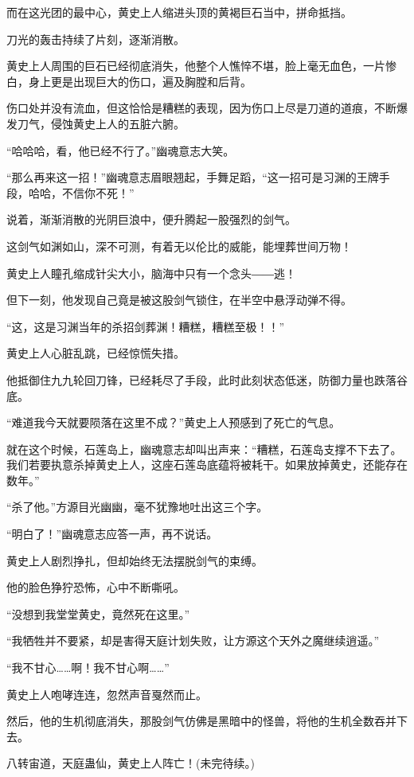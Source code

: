 \begin{this_body}
而在这光团的最中心，黄史上人缩进头顶的黄褐巨石当中，拼命抵挡。

刀光的轰击持续了片刻，逐渐消散。

黄史上人周围的巨石已经彻底消失，他整个人憔悴不堪，脸上毫无血色，一片惨白，身上更是出现巨大的伤口，遍及胸膛和后背。

伤口处并没有流血，但这恰恰是糟糕的表现，因为伤口上尽是刀道的道痕，不断爆发刀气，侵蚀黄史上人的五脏六腑。

“哈哈哈，看，他已经不行了。”幽魂意志大笑。

“那么再来这一招！”幽魂意志眉眼翘起，手舞足蹈，“这一招可是习渊的王牌手段，哈哈，不信你不死！”

说着，渐渐消散的光阴巨浪中，便升腾起一股强烈的剑气。

这剑气如渊如山，深不可测，有着无以伦比的威能，能埋葬世间万物！

黄史上人瞳孔缩成针尖大小，脑海中只有一个念头――逃！

但下一刻，他发现自己竟是被这股剑气锁住，在半空中悬浮动弹不得。

“这，这是习渊当年的杀招剑葬渊！糟糕，糟糕至极！！”

黄史上人心脏乱跳，已经惊慌失措。

他抵御住九九轮回刀锋，已经耗尽了手段，此时此刻状态低迷，防御力量也跌落谷底。

“难道我今天就要陨落在这里不成？”黄史上人预感到了死亡的气息。

就在这个时候，石莲岛上，幽魂意志却叫出声来：“糟糕，石莲岛支撑不下去了。我们若要执意杀掉黄史上人，这座石莲岛底蕴将被耗干。如果放掉黄史，还能存在数年。”

“杀了他。”方源目光幽幽，毫不犹豫地吐出这三个字。

“明白了！”幽魂意志应答一声，再不说话。

黄史上人剧烈挣扎，但却始终无法摆脱剑气的束缚。

他的脸色狰狞恐怖，心中不断嘶吼。

“没想到我堂堂黄史，竟然死在这里。”

“我牺牲并不要紧，却是害得天庭计划失败，让方源这个天外之魔继续逍遥。”

“我不甘心……啊！我不甘心啊……”

黄史上人咆哮连连，忽然声音戛然而止。

然后，他的生机彻底消失，那股剑气仿佛是黑暗中的怪兽，将他的生机全数吞并下去。

八转宙道，天庭蛊仙，黄史上人阵亡！(未完待续。)

\end{this_body}

